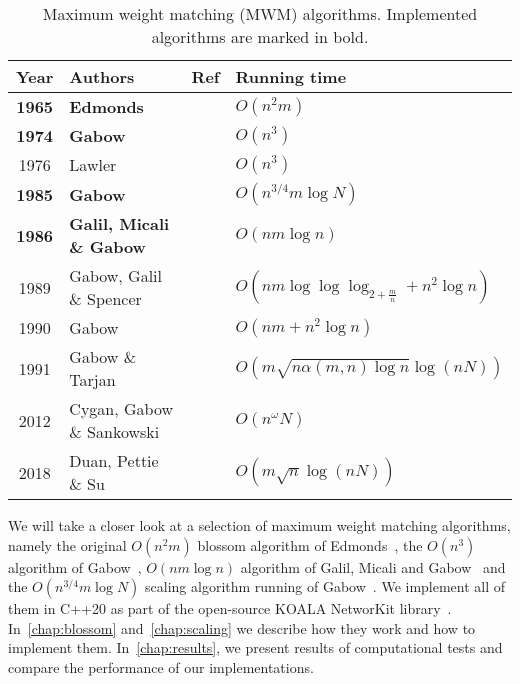 \begin{table}
\centering
\begin{tabular}{clcl}
\toprule
\textbf{Year} & \textbf{Authors} & \textbf{Ref}                 & \textbf{Running time} \\
\midrule
\textbf{1965} & \textbf{Edmonds}                   &\cite{edmonds1965maximum}     & $O(n^2m)$ \\
\textbf{1974} & \textbf{Gabow}                     &\cite{gabow1974implementation}& $O(n^3)$ \\
1976 & Lawler                    &\cite{lawler2001combinatorial}& $O(n^3)$ \\
\textbf{1985} & \textbf{Gabow}                     &\cite{gabow1985scaling}       & $O(n^{3/4}m \log N)$ \\
\textbf{1986} & \textbf{Galil, Micali \& Gabow}    &\cite{galil1986ev}            & $O(nm \log n)$ \\
1989 & Gabow, Galil \& Spencer   &\cite{gabow1989faster}        & $O(nm \log \log \log_{2 + \frac{m}{n}} + n^2\log n)$ \\
1990 & Gabow                     &\cite{gabow1990data}          & $O(nm + n^2 \log n)$ \\
1991 & Gabow \& Tarjan           &\cite{gabow1991faster}        & $O(m \sqrt{n \alpha(m, n) \log n} \log (nN))$ \\
2012 & Cygan, Gabow \& Sankowski &\cite{cygan2015algorithmic}   & $O(n^\omega N)$ \\
2018 & Duan, Pettie \& Su        &\cite{duan2018scaling}        & $O(m \sqrt{n} \log(nN))$ \\
\bottomrule
\end{tabular}
\caption{Maximum weight matching (\textsc{MWM}) algorithms. Implemented algorithms are marked in bold.}\label{tab:mwm_alogrithms}
\end{table}


We will take a closer look at a selection of maximum weight matching algorithms, namely the original $O(n^2m)$ blossom algorithm of Edmonds~\cite{edmonds1965maximum}, the $O(n^3)$ algorithm of Gabow~\cite{gabow1974implementation}, $O(nm \log n)$ algorithm of Galil, Micali and Gabow~\cite{galil1986ev} and the $O(n^{3/4}m \log N)$ scaling algorithm running of Gabow~\cite{gabow1985scaling}. We implement all of them in C++20 as part of the open-source KOALA NetworKit library~\cite{koala-networkit}. In~\autoref{chap:blossom} and~\autoref{chap:scaling} we describe how they work and how to implement them. In~\autoref{chap:results}, we present results of computational tests and compare the performance of our implementations.
